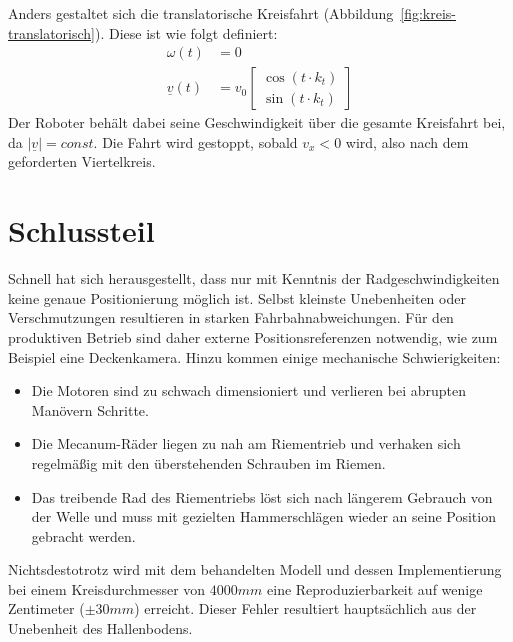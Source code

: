 \documentclass[a4paper]{article}
\begin{document}
Anders gestaltet sich die translatorische Kreisfahrt (Abbildung~\ref{fig:kreis-translatorisch}). Diese ist wie folgt definiert:
\begin{align*}
    \omega(t) &= 0 \\
    \underline{v}(t) &= v_0
        \begin{bmatrix}
            \cos(t \cdot k_t) \\
            \sin(t \cdot k_t)
        \end{bmatrix}
\end{align*}
Der Roboter behält dabei seine Geschwindigkeit über die gesamte Kreisfahrt bei, da $\left|\underline{v}\right| = const$. Die Fahrt wird gestoppt, sobald $v_x < 0$ wird, also nach dem geforderten Viertelkreis.


\section{Schlussteil}
Schnell hat sich herausgestellt, dass nur mit Kenntnis der Radgeschwindigkeiten keine genaue Positionierung möglich ist. Selbst kleinste Unebenheiten oder Verschmutzungen resultieren in starken Fahrbahnabweichungen. Für den produktiven Betrieb sind daher externe Positionsreferenzen notwendig, wie zum Beispiel eine Deckenkamera. Hinzu kommen einige mechanische Schwierigkeiten:

\begin{itemize}
    \item Die Motoren sind zu schwach dimensioniert und verlieren bei abrupten Manövern Schritte.
    \item Die Mecanum-Räder liegen zu nah am Riementrieb und verhaken sich regelmäßig mit den überstehenden Schrauben im Riemen.
    \item Das treibende Rad des Riementriebs löst sich nach längerem Gebrauch von der Welle und muss mit gezielten Hammerschlägen wieder an seine Position gebracht werden.
\end{itemize}

Nichtsdestotrotz wird mit dem behandelten Modell und dessen Implementierung bei einem Kreisdurchmesser von $4000 mm$ eine Reproduzierbarkeit auf wenige Zentimeter ($\pm 30 mm$) erreicht.
Dieser Fehler resultiert hauptsächlich aus der Unebenheit des Hallenbodens.
\end{document}
